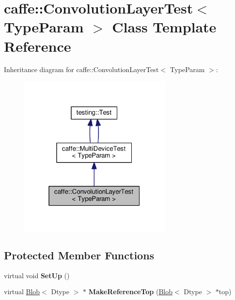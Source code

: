 \hypertarget{classcaffe_1_1_convolution_layer_test}{}\section{caffe\+:\+:Convolution\+Layer\+Test$<$ Type\+Param $>$ Class Template Reference}
\label{classcaffe_1_1_convolution_layer_test}


Inheritance diagram for caffe\+:\+:Convolution\+Layer\+Test$<$ Type\+Param $>$\+:
\nopagebreak
\begin{figure}[H]
\begin{center}
\leavevmode
\includegraphics[width=220pt]{classcaffe_1_1_convolution_layer_test__inherit__graph}
\end{center}
\end{figure}
\subsection*{Protected Member Functions}
\begin{DoxyCompactItemize}
\item 
\mbox{\label{classcaffe_1_1_convolution_layer_test_ac0a4c7808ce91c0594342b967f0b0299}} 
virtual void {\bfseries Set\+Up} ()
\item 
\mbox{\label{classcaffe_1_1_convolution_layer_test_a3486a4a4ac07612d33e566631725979a}} 
virtual \mbox{\hyperlink{classcaffe_1_1_blob}{Blob}}$<$ Dtype $>$ $\ast$ {\bfseries Make\+Reference\+Top} (\mbox{\hyperlink{classcaffe_1_1_blob}{Blob}}$<$ Dtype $>$ $\ast$top)
\end{DoxyCompactItemize}
